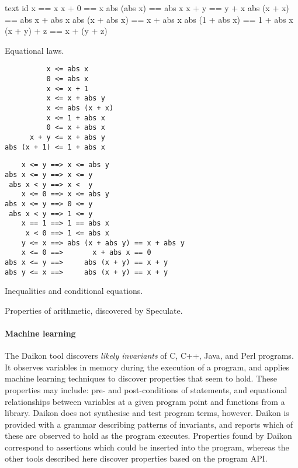 \begin{listing}
\begin{sublisting}{\textwidth}
\centering
\begin{cminted}{text}
           id x == x
          x + 0 == x
    abs (abs x) == abs x
          x + y == y + x
    abs (x + x) == abs x + abs x
abs (x + abs x) == x + abs x
abs (1 + abs x) == 1 + abs x
    (x + y) + z == x + (y + z)
\end{cminted}
\caption{Equational laws.}\label{lst:arith_props0}
\end{sublisting}

\vspace{1.5em}

\begin{sublisting}{\textwidth}
\begin{minipage}[t]{0.45\textwidth}
\begin{verbatim}
          x <= abs x
          0 <= abs x
          x <= x + 1
          x <= x + abs y
          x <= abs (x + x)
          x <= 1 + abs x
          0 <= x + abs x
      x + y <= x + abs y
abs (x + 1) <= 1 + abs x
\end{verbatim}
\end{minipage}
\begin{minipage}[t]{0.55\textwidth}
\begin{verbatim}
    x <= y ==> x <= abs y
abs x <= y ==> x <= y
 abs x < y ==> x <  y
    x <= 0 ==> x <= abs y
abs x <= y ==> 0 <= y
 abs x < y ==> 1 <= y
    x == 1 ==> 1 == abs x
     x < 0 ==> 1 <= abs x
    y <= x ==> abs (x + abs y) == x + abs y
    x <= 0 ==>       x + abs x == 0
abs x <= y ==>     abs (x + y) == x + y
abs y <= x ==>     abs (x + y) == x + y
\end{verbatim}
\end{minipage}
\caption{Inequalities and conditional equations.}\label{lst:arith_props1}
\end{sublisting}
\caption{Properties of arithmetic, discovered by Speculate.}\label{lst:arith_props}
\end{listing}

\paragraph{Machine learning}
The Daikon \parencite{ernst2007} tool discovers \emph{likely invariants} of
C, C++, Java, and Perl programs.  It observes variables in memory
during the execution of a program, and applies machine learning
techniques to discover properties that seem to hold.  These properties
may include: pre- and post-conditions of statements, and equational
relationships between variables at a given program point and functions
from a library.  Daikon does not synthesise and test program terms,
however.  Daikon is provided with a grammar describing patterns of
invariants, and reports which of these are observed to hold as the
program executes.  Properties found by Daikon correspond to assertions
which could be inserted into the program, whereas the other tools
described here discover properties based on the program API.

